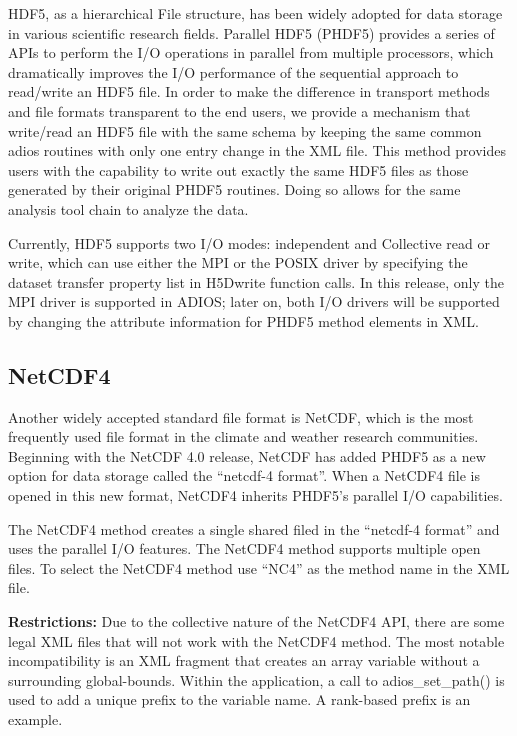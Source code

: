 HDF5, as a hierarchical File structure, has been widely adopted for data storage 
in various scientific research fields.  Parallel HDF5 (PHDF5) provides a series 
of APIs to perform the I/O operations in parallel from multiple processors, which 
dramatically improves the I/O performance of the sequential approach to read/write 
an HDF5 file. In order to make the difference in transport methods and file formats 
transparent to the end users, we provide a mechanism that write/read an HDF5 file 
with the same schema by keeping the same common adios routines with only one entry 
change in the XML file. This method provides users with the capability to write 
out exactly the same HDF5 files as those generated by their original PHDF5 routines. 
Doing so allows for the same analysis tool chain to analyze the data. 

Currently, HDF5 supports two I/O modes: independent and Collective read or write, 
which can use either the MPI or the POSIX driver by specifying the dataset transfer 
property list in H5Dwrite function calls. In this release, only the MPI driver 
is supported in ADIOS; later on, both I/O drivers will be supported by changing 
the attribute information for PHDF5 method elements in XML. \label{HToc182553387}

\subsection{NetCDF4}

Another widely accepted standard file format is NetCDF, which is the most frequently 
used file format in the climate and weather research communities.  Beginning with 
the NetCDF 4.0 release, NetCDF has added PHDF5 as a new option for data storage 
called the ``netcdf-4 format''.  When a NetCDF4 file is opened in this new format, 
NetCDF4 inherits PHDF5's parallel I/O capabilities.

The NetCDF4 method creates a single shared filed in the ``netcdf-4 format'' and 
uses the parallel I/O features.  The NetCDF4 method supports multiple open files. 
 To select the NetCDF4 method use ``NC4'' as the method name in the XML file.

\textbf{Restrictions:} Due to the collective nature of the NetCDF4 API, there are 
some legal XML files that will not work with the NetCDF4 method.  The most notable 
incompatibility is an XML fragment that creates an array variable without a surrounding 
global-bounds.  Within the application, a call to adios\_set\_path() is used to 
add a unique prefix to the variable name.  A rank-based prefix is an example. 


